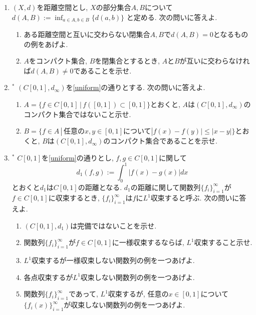 \documentclass[dvipdfmx,a4paper,11pt]{article}
\theoremstyle{definition}
\begin{document}
\begin{enumerate}[label=\textbf{問}10.\arabic*]
\item $(X,d)$を距離空間とし, $X$の部分集合$A,B$について
$d(A,B) := \inf_{a \in A, b \in B} \{ d(a,b)\}$
と定める. 次の問いに答えよ.
\begin{enumerate}
 \setlength{\parskip}{0cm}
  \setlength{\itemsep}{2pt} 
	\item ある距離空間と互いに交わらない閉集合$A,B$で$d(A,B) =0$となるものの例をあげよ.
	\item $A$をコンパクト集合, $B$を閉集合とするとき, $A$と$B$が互いに交わらなければ$d(A,B)\neq0$であることを示せ.
\end{enumerate}


\item $^{*}$ $(C[0,1], d_{\infty})$を\ref{uniform}の通りとする. 次の問いに答えよ.
\begin{enumerate}
\setlength{\parskip}{0cm}
  \setlength{\itemsep}{2pt} 
\item $A=\{ f \in C[0,1] \,|\, f([0,1]) \subset [0,1] \}$とおくと, $A$は$(C[0,1], d_{\infty})$のコンパクト集合ではないこと示せ.
\item $B=\{ f \in A \,|\, \text{任意の$x,y \in [0,1]$について}|f(x)-f(y)| \le |x-y| \}$とおくと, $B$は$(C[0,1], d_{\infty})$のコンパクト集合であることを示せ.%
\end{enumerate}


\item $^{*}$ $C[0,1]$を\ref{uniform}の通りとし, $f,g \in C[0,1]$に関して
$$
d_1(f,g) := \int_{0}^{1} |f(x) - g(x)| dx
$$
とおくと$d_1$は$C[0,1]$の距離となる. $d_1$の距離に関して関数列$\{ f_{i}\}_{i=1}^{\infty}$が$f \in C[0,1]$に収束するとき, $\{ f_{i}\}_{i=1}^{\infty}$は$f$に$L^1$収束すると呼ぶ. 次の問いに答えよ.
\begin{enumerate}
\setlength{\parskip}{0cm}
  \setlength{\itemsep}{2pt} 
\item $(C[0,1], d_1)$は完備ではないことを示せ.
\item 関数列$\{ f_{i}\}_{i=1}^{\infty}$が$f \in C[0,1]$に一様収束するならば, $L^1$収束すること示せ. 
\item $L^1$収束するが一様収束しない関数列の例を一つあげよ.
\item 各点収束するが$L^1$収束しない関数列の例を一つあげよ.
\item 関数列$\{ f_{i}\}_{i=1}^{\infty}$であって, $L^1$収束するが, 任意の$x \in [0,1]$について$\{f_{i}(x)\}_{i=1}^{\infty}$が収束しない関数列の例を一つあげよ.
\end{enumerate}


\end{enumerate}
\end{document}
